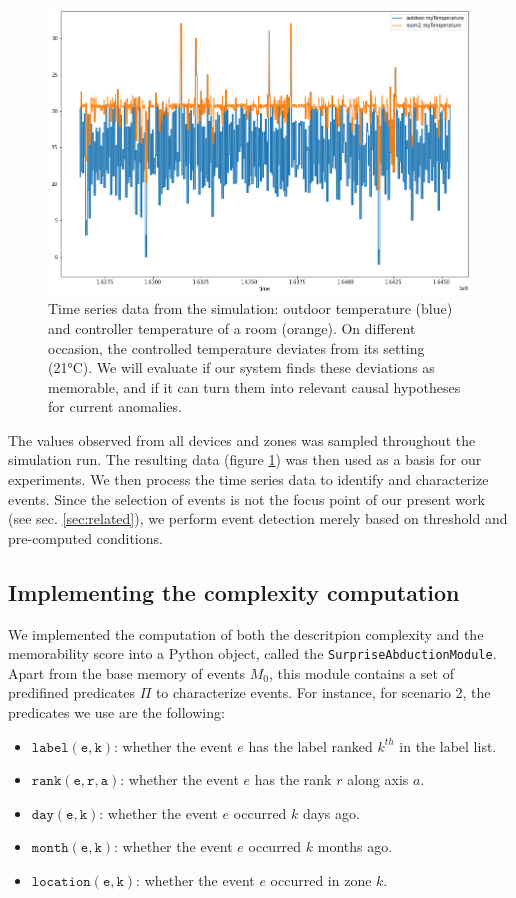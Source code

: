 \documentclass[entropy,article,submit,moreauthors,pdftex]{Definitions/mdpi}
\begin{document}
\begin{figure}[ht]
    \includegraphics[width=\linewidth]{figures/ts_example}
    \caption{Time series data from the simulation: outdoor temperature (blue) and
        controller temperature of a room (orange). On different occasion, the
        controlled temperature deviates from its setting (21°C). We will evaluate if
        our system finds these deviations as memorable, and if it can turn them into relevant causal
        hypotheses for current anomalies.}
    \label{fig:ts_example}
\end{figure}

The values observed from all devices and zones was sampled throughout
the simulation run. The resulting data (figure
\ref{fig:ts_example}) was then used as a basis for our experiments.
We then process the time series data to identify and characterize events.
Since the selection of events is not the focus point of our present work (see sec.
\ref{sec:related}), we perform event detection merely based on threshold and pre-computed conditions.


\subsection{Implementing the complexity computation}

We implemented the computation of both the descritpion complexity and the memorability score into a Python object, called the \texttt{SurpriseAbductionModule}. Apart from the base memory of events $M_0$, this module contains a set of predifined predicates $\Pi$ to characterize events. For instance, for scenario 2, the predicates we use are the following:
\begin{itemize}
    \item $\mathtt{label(e, k)}$: whether the event $e$ has the label ranked
          $k^{th}$ in the label list.
    \item $\mathtt{rank(e, r, a)}$: whether the event $e$ has the rank $r$
          along axis $a$.
    \item $\mathtt{day(e, k)}$: whether the event $e$ occurred $k$ days ago.
    \item $\mathtt{month(e, k)}$: whether the event $e$ occurred $k$ months
          ago.
    \item $\mathtt{location(e, k)}$: whether the event $e$ occurred in zone
          $k$.
\end{itemize}
\end{document}
